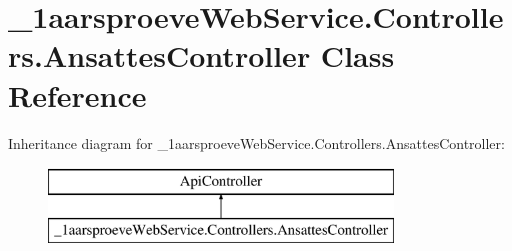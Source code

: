 \hypertarget{class__1aarsproeve_web_service_1_1_controllers_1_1_ansattes_controller}{}\section{\+\_\+1aarsproeve\+Web\+Service.\+Controllers.\+Ansattes\+Controller Class Reference}
\label{class__1aarsproeve_web_service_1_1_controllers_1_1_ansattes_controller}
Inheritance diagram for \+\_\+1aarsproeve\+Web\+Service.\+Controllers.\+Ansattes\+Controller\+:\begin{figure}[H]
\begin{center}
\leavevmode
\includegraphics[height=2.000000cm]{class__1aarsproeve_web_service_1_1_controllers_1_1_ansattes_controller}
\end{center}
\end{figure}
